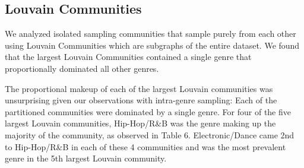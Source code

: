 \documentclass[pageno]{jpaper}
\begin{document}
\subsection{Louvain Communities}
We analyzed isolated sampling communities that sample purely from each other using Louvain Communities which are subgraphs of the entire dataset. We found that the largest Louvain Communities contained a single genre that proportionally dominated all other genres.
\begin{table}[H]
\caption{Top Genre Makeup in n'th Largest Louvain Communities Overall}
\label{table:table6}
\end{table}
The proportional makeup of each of the largest Louvain communities was unsurprising given our observations with intra-genre sampling: Each of the partitioned communities were dominated by a single genre. For four of the five largest Louvain communities, Hip-Hop/R\&B was the genre making up the majority of the community, as observed in Table 6. Electronic/Dance came 2nd to Hip-Hop/R\&B in each of these 4 communities and was the most prevalent genre in the 5th largest Louvain community.
\end{document}
